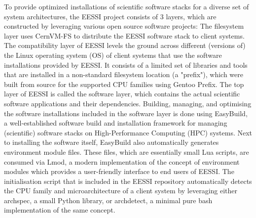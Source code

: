 To provide optimized installations of scientific software stacks for a diverse set of system architectures, the EESSI project consists of 3 layers, which are constructed by leveraging various open source software projects:
The filesystem layer uses CernVM-FS to distribute the EESSI software stack to client systems. The compatibility layer of EESSI levels the ground across different (versions of) the Linux operating system (OS) of client systems that use the software installations provided by EESSI. It consists of a limited set of libraries and tools that are installed in a non-standard filesystem location (a "prefix"), which were built from source for the supported CPU families using Gentoo Prefix. The top layer of EESSI is called the software layer, which contains the actual scientific software applications and their dependencies. Building, managing, and optimising the software installations included in the software layer is done using EasyBuild, a well-established software build and installation framework for managing (scientific) software stacks on High-Performance Computing (HPC) systems. Next to installing the software itself, EasyBuild also automatically generates environment module files. These files, which are essentially small Lua scripts, are consumed via Lmod, a modern implementation of the concept of environment modules which provides a user-friendly interface to end users of EESSI. The initialisation script that is included in the EESSI repository automatically detects the CPU family and microarchitecture of a client system by leveraging either archspec, a small Python library, or archdetect, a minimal pure bash implementation of the same concept.


